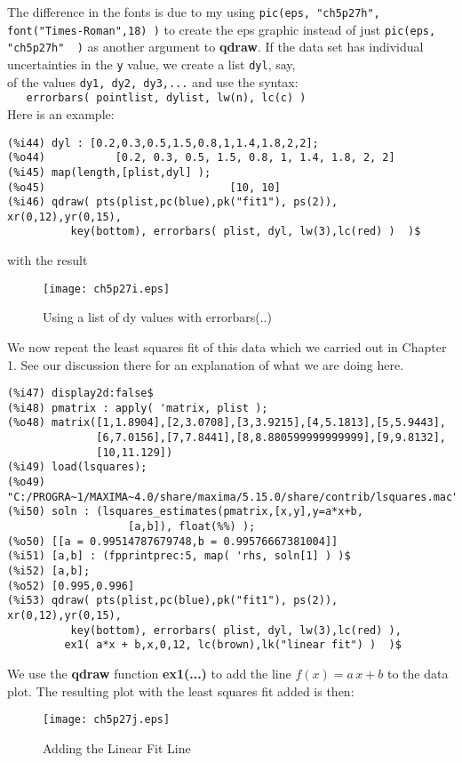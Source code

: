\documentclass[12pt]{article}
\begin{document}
\smallskip
The difference in the fonts is due to my using
  \verb|pic(eps, "ch5p27h", font("Times-Roman",18) )| to create the eps graphic instead
  of just \verb|pic(eps, "ch5p27h"  )| as another argument  to \textbf{qdraw}.
\newpage
If the data set has individual uncertainties in the \verb|y| value, we create a
  list \verb|dyl|, say, \\
  of the values \verb|dy1, dy2, dy3,...| and use the syntax:\\
  \verb|   errorbars( pointlist, dylist, lw(n), lc(c) )| \\
Here is an example:
\small
\begin{verbatim}
(%i44) dyl : [0.2,0.3,0.5,1.5,0.8,1,1.4,1.8,2,2];
(%o44)           [0.2, 0.3, 0.5, 1.5, 0.8, 1, 1.4, 1.8, 2, 2]
(%i45) map(length,[plist,dyl] );
(%o45)                             [10, 10]
(%i46) qdraw( pts(plist,pc(blue),pk("fit1"), ps(2)), xr(0,12),yr(0,15),
          key(bottom), errorbars( plist, dyl, lw(3),lc(red) )  )$
\end{verbatim}
\normalsize
%  
with the result
\begin{figure} [h]
   \centerline{\texttt{[image: ch5p27i.eps]} }
	\caption{Using a list of dy values with errorbars(..) }
\end{figure} 

\smallskip
We now repeat the least squares fit of this data which we carried out in Chapter 1.
See our discussion there for an explanation of what we are doing here.
\small
\begin{verbatim}
(%i47) display2d:false$
(%i48) pmatrix : apply( 'matrix, plist );
(%o48) matrix([1,1.8904],[2,3.0708],[3,3.9215],[4,5.1813],[5,5.9443],
              [6,7.0156],[7,7.8441],[8,8.880599999999999],[9,9.8132],
              [10,11.129])
(%i49) load(lsquares);
(%o49) "C:/PROGRA~1/MAXIMA~4.0/share/maxima/5.15.0/share/contrib/lsquares.mac"
(%i50) soln : (lsquares_estimates(pmatrix,[x,y],y=a*x+b,
                   [a,b]), float(%%) );
(%o50) [[a = 0.99514787679748,b = 0.99576667381004]]
(%i51) [a,b] : (fpprintprec:5, map( 'rhs, soln[1] ) )$
(%i52) [a,b];
(%o52) [0.995,0.996]
(%i53) qdraw( pts(plist,pc(blue),pk("fit1"), ps(2)), xr(0,12),yr(0,15),
          key(bottom), errorbars( plist, dyl, lw(3),lc(red) ),
         ex1( a*x + b,x,0,12, lc(brown),lk("linear fit") )  )$
\end{verbatim}
\normalsize
%
\newpage
We use the \textbf{qdraw} function \textbf{ex1(...)} to add the line
 $f(x) = a\,x + b$ to the data plot.
The resulting plot with the least squares fit added is then:
\begin{figure} [h]
   \centerline{\texttt{[image: ch5p27j.eps]} }
	\caption{Adding the Linear Fit Line }
\end{figure} 
\end{document}
